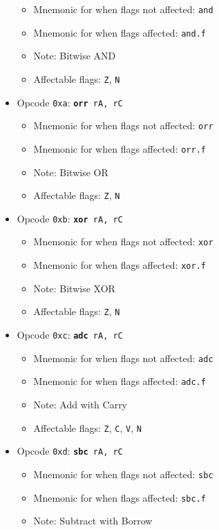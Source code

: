 \documentclass{article}
\begin{document}
\begin{itemize}
\begin{itemize}
			\item Mnemonic for when flags not affected:  \texttt{and}
			\item Mnemonic for when flags affected:  \texttt{and.f}
			\item Note:  Bitwise AND
			\item Affectable flags:
				\texttt{Z}, \texttt{N}
		\end{itemize}
		\item Opcode \texttt{0xa}:
			\texttt{\textbf{orr} rA, rC}
		\begin{itemize}
			\item Mnemonic for when flags not affected:  \texttt{orr}
			\item Mnemonic for when flags affected:  \texttt{orr.f}
			\item Note:  Bitwise OR
			\item Affectable flags:
				\texttt{Z}, \texttt{N}
		\end{itemize}
		\item Opcode \texttt{0xb}:
			\texttt{\textbf{xor} rA, rC}
		\begin{itemize}
			\item Mnemonic for when flags not affected:  \texttt{xor}
			\item Mnemonic for when flags affected:  \texttt{xor.f}
			\item Note:  Bitwise XOR
			\item Affectable flags:
				\texttt{Z}, \texttt{N}
		\end{itemize}
		\item Opcode \texttt{0xc}:
			\texttt{\textbf{adc} rA, rC}
		\begin{itemize}
			\item Mnemonic for when flags not affected:  \texttt{adc}
			\item Mnemonic for when flags affected:  \texttt{adc.f}
			\item Note:  Add with Carry
			\item Affectable flags:
				\texttt{Z}, \texttt{C}, \texttt{V}, \texttt{N}
		\end{itemize}
		\item Opcode \texttt{0xd}:
			\texttt{\textbf{sbc} rA, rC}
		\begin{itemize}
			\item Mnemonic for when flags not affected:  \texttt{sbc}
			\item Mnemonic for when flags affected:  \texttt{sbc.f}
			\item Note:  Subtract with Borrow

\end{itemize}
\end{itemize}
\end{document}

